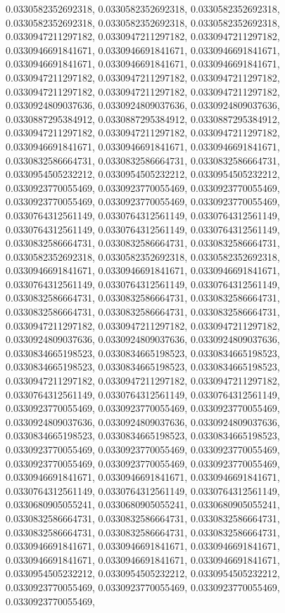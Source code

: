 \documentclass[
  ,man]{apa6}
\begin{document}
0.0330582352692318, 0.0330582352692318, 0.0330582352692318, 0.0330582352692318, 0.0330582352692318, 0.0330582352692318, 0.0330947211297182, 0.0330947211297182, 0.0330947211297182, 0.0330946691841671, 0.0330946691841671, 0.0330946691841671, 0.0330946691841671, 0.0330946691841671, 0.0330946691841671, 0.0330947211297182, 0.0330947211297182, 0.0330947211297182, 0.0330947211297182, 0.0330947211297182, 0.0330947211297182, 0.0330924809037636, 0.0330924809037636, 0.0330924809037636, 0.0330887295384912, 0.0330887295384912,
0.0330887295384912, 0.0330947211297182, 0.0330947211297182, 0.0330947211297182, 0.0330946691841671, 0.0330946691841671, 0.0330946691841671, 0.0330832586664731, 0.0330832586664731, 0.0330832586664731, 0.0330954505232212, 0.0330954505232212, 0.0330954505232212, 0.0330923770055469, 0.0330923770055469, 0.0330923770055469, 0.0330923770055469, 0.0330923770055469, 0.0330923770055469, 0.0330764312561149, 0.0330764312561149, 0.0330764312561149, 0.0330764312561149, 0.0330764312561149, 0.0330764312561149, 0.0330832586664731,
0.0330832586664731, 0.0330832586664731, 0.0330582352692318, 0.0330582352692318, 0.0330582352692318, 0.0330946691841671, 0.0330946691841671, 0.0330946691841671, 0.0330764312561149, 0.0330764312561149, 0.0330764312561149, 0.0330832586664731, 0.0330832586664731, 0.0330832586664731, 0.0330832586664731, 0.0330832586664731, 0.0330832586664731, 0.0330947211297182, 0.0330947211297182, 0.0330947211297182, 0.0330924809037636, 0.0330924809037636, 0.0330924809037636, 0.0330834665198523, 0.0330834665198523, 0.0330834665198523,
0.0330834665198523, 0.0330834665198523, 0.0330834665198523, 0.0330947211297182, 0.0330947211297182, 0.0330947211297182, 0.0330764312561149, 0.0330764312561149, 0.0330764312561149, 0.0330923770055469, 0.0330923770055469, 0.0330923770055469, 0.0330924809037636, 0.0330924809037636, 0.0330924809037636, 0.0330834665198523, 0.0330834665198523, 0.0330834665198523, 0.0330923770055469, 0.0330923770055469, 0.0330923770055469, 0.0330923770055469, 0.0330923770055469, 0.0330923770055469, 0.0330946691841671, 0.0330946691841671,
0.0330946691841671, 0.0330764312561149, 0.0330764312561149, 0.0330764312561149, 0.0330680905055241, 0.0330680905055241, 0.0330680905055241, 0.0330832586664731, 0.0330832586664731, 0.0330832586664731, 0.0330832586664731, 0.0330832586664731, 0.0330832586664731, 0.0330946691841671, 0.0330946691841671, 0.0330946691841671, 0.0330946691841671, 0.0330946691841671, 0.0330946691841671, 0.0330954505232212, 0.0330954505232212, 0.0330954505232212, 0.0330923770055469, 0.0330923770055469, 0.0330923770055469, 0.0330923770055469,
\end{document}
